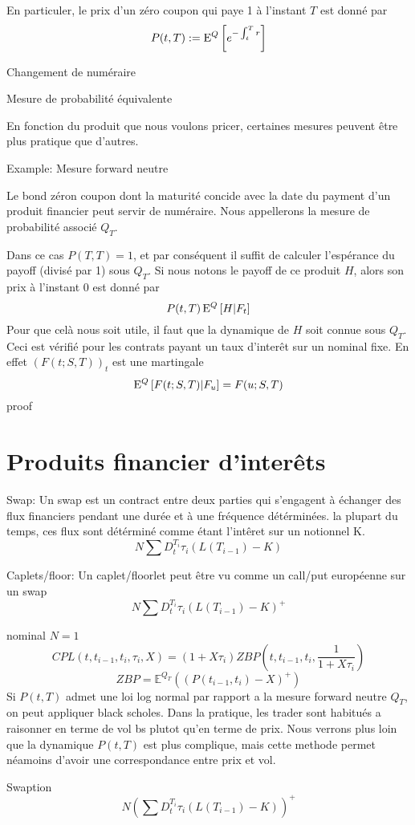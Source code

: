 En particuler, le prix d'un zéro coupon qui paye 1 à l'instant $T$ est donné par
$$ P(t, T) := \mathrm{E}^Q \left[   e^{-\int_t^T r}  \right] $$

\begin{defn} Changement de numéraire \end{defn}
\begin{defn} Mesure de probabilité équivalente \end{defn}

En fonction du produit que nous voulons pricer, certaines mesures peuvent être plus pratique que d'autres.

Example: Mesure forward neutre

Le bond zéron coupon dont la maturité concide avec la date du payment d'un produit financier peut servir de numéraire. Nous appellerons la mesure de probabilité associé $Q_T$.

Dans ce cas $P(T, T) = 1$, et par conséquent il suffit de calculer l'espérance du payoff (divisé par 1) sous $Q_T$.
Si nous notons le payoff de ce produit $H$, alors son prix à l'instant $0$ est donné par $$P(t, T) \, \mathrm{E}^Q \left[  H | F_t  \right] $$
Pour que celà nous soit utile, il faut que la dynamique de $H$ soit connue sous $Q_T$. Ceci est vérifié pour les contrats payant un taux d'interêt sur un nominal fixe. En effet $(F(t; S, T))_t$ est une martingale 
$$ \mathrm{E}^Q \left[  F(t; S, T) | F_u  \right] = F(u; S, T)$$
proof



\newpage

\section{Produits financier d'interêts}
\begin{defn}
  Swap:
Un swap est un contract entre deux parties qui s'engagent à échanger des flux financiers pendant une durée et à une fréquence détérminées. la plupart du temps, ces flux sont détérminé comme étant l'intêret sur un notionnel K. 
$$ N \sum D_t^{T_i} \tau_i (L(T_{i-1}) - K) $$
\end{defn}


\begin{defn}
  Caplets/floor:
Un caplet/floorlet peut être vu comme un call/put européenne sur un swap
$$ N \sum D_t^{T_i} \tau_i (L(T_{i-1}) - K)^+ $$
\end{defn}

nominal $N = 1$
$$ CPL(t, t_{i-1}, t_i, \tau_i, X) = (1+X \tau_i) ZBP(t, t_{i-1}, t_i, \frac{1}{1+X \tau_i})$$
$$ZBP = \mathbb{E}^{Q_T}(  (P(t_{i-1}, t_i) - X)^+ )$$
Si $P(t, T)$ admet une loi log normal par rapport a la mesure forward neutre $Q_T$, on peut appliquer black scholes. Dans la pratique, les trader sont habitués a raisonner en terme de vol bs plutot qu'en terme de prix. Nous verrons plus loin que la dynamique $P(t, T)$ est plus complique, mais cette methode permet néamoins d'avoir une correspondance entre prix et vol.


\begin{defn}
Swaption
$$ N (\sum D_t^{T_i} \tau_i (L(T_{i-1}) - K))^+ $$
\end{defn}

